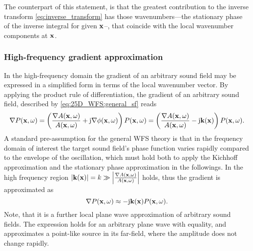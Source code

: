 The counterpart of this statement, is that the greatest contribution to the inverse transform \eqref{eq:inverse_transform} has those wavenumbers---the stationary phase of the inverse integral for given $\mathbf{x}$--, that coincide with the local wavenumber components at $\mathbf{x}$.

\subsubsection{High-frequency gradient approximation}

In the high-frequency domain the gradient of an arbitrary sound field may be expressed in a simplified form in terms of the local wavenumber vector.
By applying the product rule of differentiation, the gradient of an arbitrary sound field, described by \eqref{eq:25D_WFS:general_sf} reads
\begin{equation}
\nabla P(\mathbf{x},\omega) = \left(  \frac{\nabla A(\mathbf{x},\omega)}{A(\mathbf{x},\omega)} + \mathrm{j} \nabla \phi(\mathbf{x},\omega) \right) P(\mathbf{x},\omega) =  \left(  \frac{\nabla A(\mathbf{x},\omega)}{A(\mathbf{x},\omega)} - \mathrm{j} \mathbf{k}(\mathbf{x}) \right) P(\mathbf{x},\omega).
\end{equation}
A standard pre-assumption for the general WFS theory is that in the frequency domain of interest the target sound field's phase function varies rapidly compared to the envelope of the oscillation, which must hold both to apply the Kichhoff approximation and the stationary phase approximation in the followings. In the high frequency region $|\mathbf{k}(\mathbf{x})| = k \gg \left| \frac{ \nabla A(\mathbf{x},\omega)}{A(\mathbf{x},\omega)} \right|$ holds, thus the gradient is approximated as
\begin{equation}
\nabla P(\mathbf{x},\omega) \approx - \mathrm{j} \mathbf{k}(\mathbf{x}) P(\mathbf{x},\omega).
\label{eq:25D_WFS:gradient_appr}
\end{equation}
Note, that it is a further local plane wave approximation of arbitrary sound fields.
The expression holds for an arbitrary plane wave with equality, and approximates a point-like source in its far-field, where the amplitude does not change rapidly.

